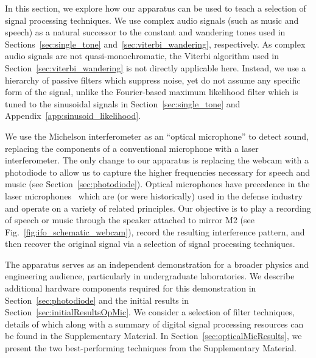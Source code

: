 \documentclass[paper-main.tex]{subfiles}
\begin{document}
In this section, we explore how our apparatus can be used to teach a selection of signal processing techniques. 
We use complex audio signals (such as music and speech) as a natural successor to the constant and wandering tones used in Sections~\ref{sec:single_tone} and~\ref{sec:viterbi_wandering}, respectively.
As complex audio signals are not quasi-monochromatic, the Viterbi algorithm used in Section~\ref{sec:viterbi_wandering} is not directly applicable here. 
Instead, we use a hierarchy of passive filters which suppress noise, yet do not assume any specific form of the signal, unlike the Fourier-based maximum likelihood filter which is tuned to the sinusoidal signals in Section~\ref{sec:single_tone} and Appendix~\ref{app:sinusoid_likelihood}.


We use the Michelson interferometer as an ``optical microphone'' to detect sound, replacing the components of a conventional microphone with a laser interferometer.
The only change to our apparatus is replacing the webcam with a photodiode to allow us to capture the higher frequencies necessary for speech and music (see Section~\ref{sec:photodiode}). 
Optical microphones have precedence in the laser microphones~\cite{laser_microphone} which are (or were historically) used in the defense industry and operate on a variety of related principles. 
Our objective is to play a recording of speech or music through the speaker attached to mirror M2 (see Fig.~\ref{fig:ifo_schematic_webcam}), record the resulting interference pattern, and then recover the original signal via a selection of signal processing techniques. 



The apparatus serves as an independent demonstration for a broader physics and engineering audience, particularly in undergraduate laboratories. 
We describe additional hardware components required for this demonstration in Section~\ref{sec:photodiode} and the initial results in Section~\ref{sec:initialResultsOpMic}. 
We consider a selection of filter techniques, details of which along with a summary of digital signal processing resources can be found in the Supplementary Material. 
In Section~\ref{sec:opticalMicResults}, we present the two best-performing techniques from the Supplementary Material. 
\end{document}
